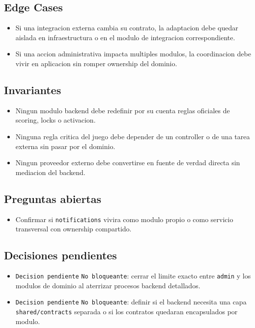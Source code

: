 \subsection{Edge Cases}

\begin{itemize}
  \item Si una integracion externa cambia su contrato, la adaptacion debe quedar aislada en infraestructura o en el modulo de integracion correspondiente.
  \item Si una accion administrativa impacta multiples modulos, la coordinacion debe vivir en aplicacion sin romper ownership del dominio.
\end{itemize}

\subsection{Invariantes}

\begin{itemize}
  \item Ningun modulo backend debe redefinir por su cuenta reglas oficiales de scoring, locks o activacion.
  \item Ninguna regla critica del juego debe depender de un controller o de una tarea externa sin pasar por el dominio.
  \item Ningun proveedor externo debe convertirse en fuente de verdad directa sin mediacion del backend.
\end{itemize}

\subsection{Preguntas abiertas}

\begin{itemize}
  \item Confirmar si \texttt{notifications} vivira como modulo propio o como servicio transversal con ownership compartido.
\end{itemize}

\subsection{Decisiones pendientes}

\begin{itemize}
  \item \texttt{Decision pendiente} \texttt{No bloqueante}: cerrar el limite exacto entre \texttt{admin} y los modulos de dominio al aterrizar procesos backend detallados.
  \item \texttt{Decision pendiente} \texttt{No bloqueante}: definir si el backend necesita una capa \texttt{shared/contracts} separada o si los contratos quedaran encapsulados por modulo.
\end{itemize}
